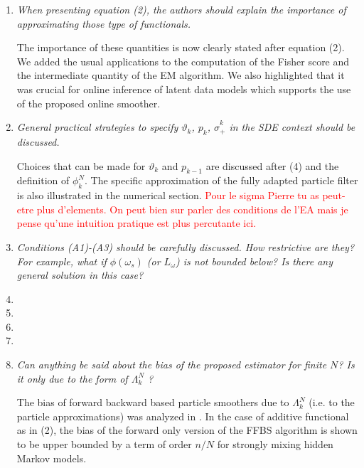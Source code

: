 \documentclass[12pt]{article}
\newcommand{\1}{\mathrm{1}}
\begin{document}
\begin{enumerate}
\item {\em When presenting equation (2), the authors should explain the importance of approximating those type of functionals.}

\vspace{.3cm}

The importance of these quantities is now clearly stated after equation (2). We added the usual applications to the computation of the Fisher score and the intermediate quantity of the EM algorithm. We also highlighted that it was crucial for online inference of latent data models which supports the use of the proposed online smoother.

\item {\em General practical strategies to specify $\vartheta_k$, $p_k$, $\hat{\sigma}_+^k$ in the SDE context should be
discussed.}

\vspace{.3cm}

Choices that can be made for  $\vartheta_k$ and $p_{k-1}$ are discussed after (4) and the definition of $\phi_k^N$. The specific approximation of the fully adapted particle filter is also illustrated in the numerical section. \textcolor{red}{Pour le sigma Pierre tu as peut-etre plus d'elements. On peut bien sur parler des conditions de l'EA mais je pense qu'une intuition pratique est plus percutante ici.}

\item {\em Conditions (A1)-(A3) should be carefully discussed. How restrictive are they? For
example, what if $\phi(\omega_s)$ (or $L_\omega$) is not bounded below? Is there any general solution
in this case?}

\vspace{.3cm}

\item
\item
\item
\item
\item {\em Can anything be said about the bias of the proposed estimator for finite $N$? Is it
only due to the form of  $\Lambda_k^N$ ?}

\vspace{.3cm}

The bias of forward backward based particle smoothers due to $\Lambda_k^N$ (i.e. to the particle approximations) was analyzed in \cite{delmoral:doucet:singh:2010}. In the case of additive functional as in (2), the bias of the forward only version of the FFBS algorithm is shown to be upper bounded by a term of order $n/N$ for strongly mixing hidden Markov models.  



\end{enumerate}
\end{document}
